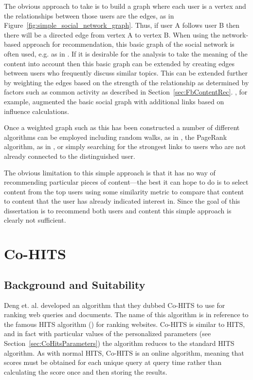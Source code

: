 The obvious approach to take is to build a graph where each user is a vertex and the relationships between those users are the edges, as in Figure~\ref{fig:simple_social_network_graph}. Thus, if user A follows user B then there will be a directed edge from vertex A to vertex B. When using the network-based approach for recommendation, this basic graph of the social network is often used, e.g. as in \cite{Hangal2010}. If it is desirable for the analysis to take the meaning of the content into account then this basic graph can be extended by creating edges between users who frequently discuss similar topics. This can be extended further by weighting the edges based on the strength of the relationship as determined by factors such as common activity as described in Section~\ref{sec:FbContentRec}. \cite{Hangal2010}, for example, augmented the basic social graph with additional links based on influence calculations.

Once a weighted graph such as this has been constructed a number of different algorithms can be employed including random walks, as in \cite{Backstrom2010}, the PageRank algorithm, as in \cite{Weng2010}, or simply searching for the strongest links to users who are not already connected to the distinguished user.

The obvious limitation to this simple approach is that it has no way of recommending particular pieces of content---the best it can hope to do is to select content from the top users using some similarity metric to compare that content to content that the user has already indicated interest in. Since the goal of this dissertation is to recommend both users and content this simple approach is clearly not sufficient.

\section{Co-HITS}

\subsection{Background and Suitability}
\label{sec:CoHitsBackground}

Deng et. al. \cite{Deng2009} developed an algorithm that they dubbed Co-HITS to use for ranking web queries and documents. The name of this algorithm is in reference to the famous HITS algorithm (\cite{Kleinberg1999}) for ranking websites. Co-HITS is similar to HITS, and in fact with particular values of the personalized parameters (see Section~\ref{sec:CoHitsParameters}) the algorithm reduces to the standard HITS algorithm. As with normal HITS, Co-HITS is an online algorithm, meaning that scores must be obtained for each unique query at query time rather than calculating the score once and then storing the results.

